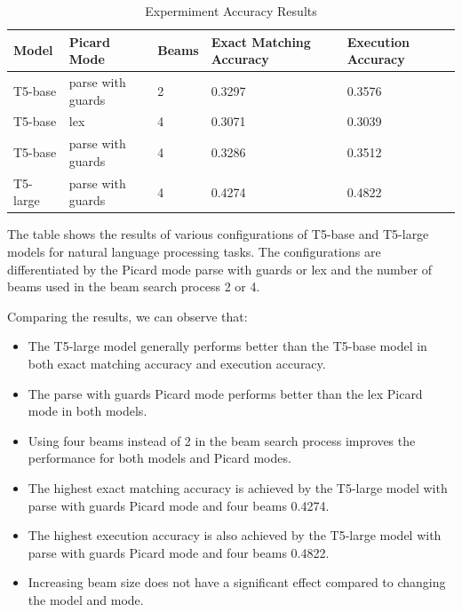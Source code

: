 \begin{table}[!ht]
    \centering
    \begin{tabular}{|l|l|l|L|L|}
        \hline
        Model    & Picard Mode       & Beams & \textbf{Exact Matching Accuracy} & \textbf{Execution Accuracy} \\ \hline
        T5-base  & parse with guards & 2     & 0.3297                           & 0.3576                      \\ \hline
        T5-base  & lex               & 4     & 0.3071                           & 0.3039                      \\ \hline
        T5-base  & parse with guards & 4     & 0.3286                           & 0.3512                      \\ \hline
        T5-large & parse with guards & 4     & 0.4274                           & 0.4822                      \\ \hline
    \end{tabular}
    \caption{Expermiment Accuracy Results}
\end{table}

The table shows the results of various configurations of T5-base and T5-large models for natural language processing tasks. The configurations are differentiated by the Picard mode parse with guards or lex and the number of beams used in the beam search process 2 or 4.

Comparing the results, we can observe that:
\begin{itemize}
    \item The T5-large model generally performs better than the T5-base model in both exact matching accuracy and execution accuracy.
    \item The parse with guards Picard mode performs better than the lex Picard mode in both models.
    \item Using four beams instead of 2 in the beam search process improves the performance for both models and Picard modes.
    \item The highest exact matching accuracy is achieved by the T5-large model with parse with guards Picard mode and four beams 0.4274.
    \item The highest execution accuracy is also achieved by the T5-large model with parse with guards Picard mode and four beams 0.4822.
    \item Increasing beam size does not have a significant effect compared to changing the model and mode.
\end{itemize}


